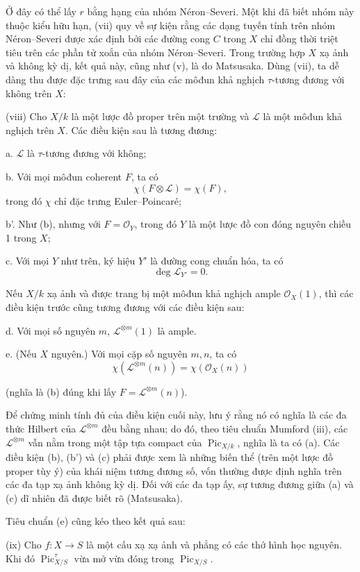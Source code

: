Ở đây có thể lấy $r$ bằng hạng của nhóm Néron--Severi. Một khi đã biết nhóm
này thuộc kiểu hữu hạn, (vii) quy về sự kiện rằng các dạng tuyến tính trên
nhóm Néron--Severi được xác định bởi các đường cong $C$ trong $X$ chỉ đồng
thời triệt tiêu trên các phần tử xoắn của nhóm Néron--Severi. Trong trường hợp
$X$ xạ ảnh và không kỳ dị, kết quả này, cũng như (v), là do Matsusaka. Dùng
(vii), ta dễ dàng thu được đặc trưng sau đây của các môđun khả nghịch
$\tau$-tương đương với không trên $X$:

\medskip
\noindent(viii) Cho $X/k$ là một lược đồ proper trên một trường và
$\mathcal L$ là một môđun khả nghịch trên $X$. Các điều kiện sau là tương
đương:

\noindent a. $\mathcal L$ là $\tau$-tương đương với không;

\noindent b. Với mọi môđun coherent $F$, ta có
\[
\chi(F\otimes\mathcal L)=\chi(F),
\]
trong đó $\chi$ chỉ đặc trưng Euler--Poincaré;

\noindent b'. Như (b), nhưng với $F=\mathcal O_Y$, trong đó $Y$ là một lược
đồ con đóng nguyên chiều 1 trong $X$;

\noindent c. Với mọi $Y$ như trên, ký hiệu $Y'$ là đường cong chuẩn hóa, ta
có
\[
\deg\mathcal L_{Y'}=0.
\]

Nếu $X/k$ xạ ảnh và được trang bị một môđun khả nghịch ample
$\mathcal O_X(1)$, thì các điều kiện trước cũng tương đương với các điều kiện
sau:

\noindent d. Với mọi số nguyên $m$, $\mathcal L^{\otimes m}(1)$ là ample.

\noindent e. (Nếu $X$ nguyên.) Với mọi cặp số nguyên $m,n$, ta có
\[
\chi(\mathcal L^{\otimes m}(n))=\chi(\mathcal O_X(n))
\]

(nghĩa là (b) đúng khi lấy $F=\mathcal L^{\otimes m}(n)$).

Để chứng minh tính đủ của điều kiện cuối này, lưu ý rằng nó có nghĩa là các
đa thức Hilbert của $\mathcal L^{\otimes m}$ đều bằng nhau; do đó, theo tiêu
chuẩn Mumford (iii), các $\mathcal L^{\otimes m}$ vẫn nằm trong một tập tựa
compact của $\operatorname{Pic}_{X/k}$, nghĩa là ta có (a). Các điều kiện (b),
(b') và (c) phải được xem là những biến thể (trên một lược đồ proper tùy ý)
của khái niệm tương đương số, vốn thường được định nghĩa trên các đa tạp xạ
ảnh không kỳ dị. Đối với các đa tạp ấy, sự tương đương giữa (a) và (c) dĩ
nhiên đã được biết rõ (Matsusaka).

Tiêu chuẩn (e) cũng kéo theo kết quả sau:

\medskip
\noindent(ix) Cho $f:X\longrightarrow S$ là một cấu xạ xạ ảnh và phẳng có
các thớ hình học nguyên. Khi đó $\operatorname{Pic}_{X/S}^\tau$ vừa mở vừa
đóng trong $\operatorname{Pic}_{X/S}$.

